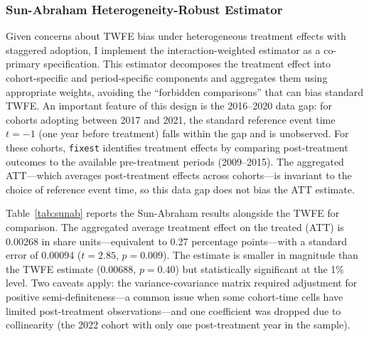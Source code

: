 \documentclass[12pt]{article}
\begin{document}
\subsubsection{Sun-Abraham Heterogeneity-Robust Estimator}

Given concerns about TWFE bias under heterogeneous treatment effects with staggered adoption, I implement the \citet{sun2021estimating} interaction-weighted estimator as a co-primary specification. This estimator decomposes the treatment effect into cohort-specific and period-specific components and aggregates them using appropriate weights, avoiding the ``forbidden comparisons'' that can bias standard TWFE. An important feature of this design is the 2016--2020 data gap: for cohorts adopting between 2017 and 2021, the standard reference event time $t = -1$ (one year before treatment) falls within the gap and is unobserved. For these cohorts, \texttt{fixest} identifies treatment effects by comparing post-treatment outcomes to the available pre-treatment periods (2009--2015). The aggregated ATT---which averages post-treatment effects across cohorts---is invariant to the choice of reference event time, so this data gap does not bias the ATT estimate.

Table~\ref{tab:sunab} reports the Sun-Abraham results alongside the TWFE for comparison. The aggregated average treatment effect on the treated (ATT) is 0.00268 in share units---equivalent to 0.27 percentage points---with a standard error of 0.00094 ($t = 2.85$, $p = 0.009$). The estimate is smaller in magnitude than the TWFE estimate (0.00688, $p = 0.40$) but statistically significant at the 1\% level. Two caveats apply: the variance-covariance matrix required adjustment for positive semi-definiteness---a common issue when some cohort-time cells have limited post-treatment observations---and one coefficient was dropped due to collinearity (the 2022 cohort with only one post-treatment year in the sample).
\end{document}
